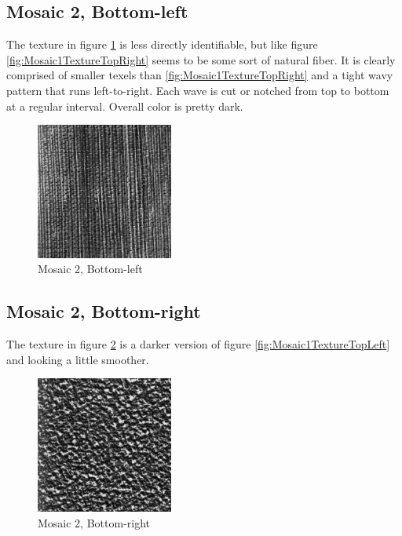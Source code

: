 \documentclass[a4paper,12pt,titlepage]{article}
\begin{document}
\subsection*{Mosaic 2, Bottom-left}
The texture in figure \ref{fig:Mosaic2TextureBottomLeft} is less directly identifiable, but like figure \ref{fig:Mosaic1TextureTopRight} seems to be some sort of natural fiber. It is clearly comprised of smaller texels than \ref{fig:Mosaic1TextureTopRight} and a tight wavy pattern that runs left-to-right. Each wave is cut or notched from top to bottom at a regular interval. Overall color is pretty dark.

\begin{figure}[H]
\includegraphics[width=0.4\textwidth]{textures/mosaic2-subimage-bottom-left}
\caption{Mosaic 2, Bottom-left}
\label{fig:Mosaic2TextureBottomLeft}
\end{figure}

\subsection*{Mosaic 2, Bottom-right}
The texture in figure \ref{fig:Mosaic2TextureBottomRight} is a darker version of figure \ref{fig:Mosaic1TextureTopLeft} and looking a little smoother.

\begin{figure}[H]
\includegraphics[width=0.4\textwidth]{textures/mosaic2-subimage-bottom-right}
\caption{Mosaic 2, Bottom-right}
\label{fig:Mosaic2TextureBottomRight}
\end{figure}
\end{document}
